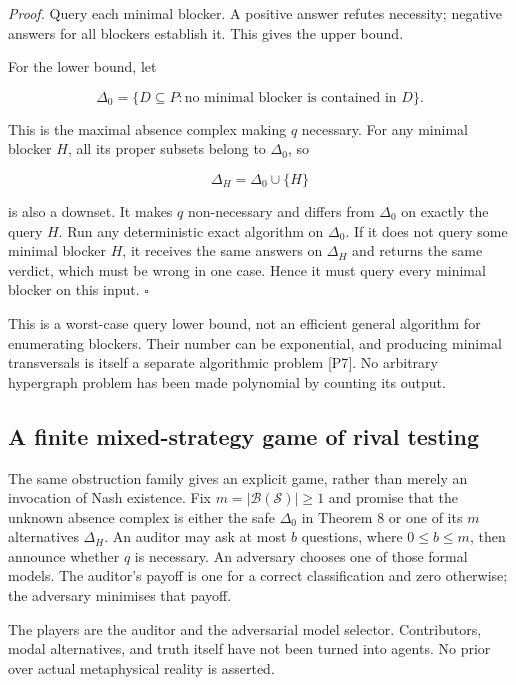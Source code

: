 \documentclass[11pt,a4paper]{article}
\begin{document}
\emph{Proof.} Query each minimal blocker. A positive answer refutes
necessity; negative answers for all blockers establish it. This gives
the upper bound.

For the lower bound, let

\nopagebreak[4]

\[
\Delta_0
 =\{D\subseteq P:\text{no minimal blocker is contained in }D\}.
\]

This is the maximal absence complex making \(q\) necessary. For any
minimal blocker \(H\), all its proper subsets belong to \(\Delta_0\), so

\nopagebreak[4]

\[
\Delta_H=\Delta_0\cup\{H\}
\]

is also a downset. It makes \(q\) non-necessary and differs from
\(\Delta_0\) on exactly the query \(H\). Run any deterministic exact
algorithm on \(\Delta_0\). If it does not query some minimal blocker
\(H\), it receives the same answers on \(\Delta_H\) and returns the same
verdict, which must be wrong in one case. Hence it must query every
minimal blocker on this input. \(\square\)

This is a worst-case query lower bound, not an efficient general
algorithm for enumerating blockers. Their number can be exponential, and
producing minimal transversals is itself a separate algorithmic problem
{[}P7{]}. No arbitrary hypergraph problem has been made polynomial by
counting its output.

\subsection{A finite mixed-strategy game of rival
testing}\label{a-finite-mixed-strategy-game-of-rival-testing}

The same obstruction family gives an explicit game, rather than merely
an invocation of Nash existence. Fix \(m=|\mathscr B(\mathscr S)|\ge1\)
and promise that the unknown absence complex is either the safe
\(\Delta_0\) in Theorem 8 or one of its \(m\) alternatives \(\Delta_H\).
An auditor may ask at most \(b\) questions, where \(0\le b\le m\), then
announce whether \(q\) is necessary. An adversary chooses one of those
formal models. The auditor's payoff is one for a correct classification
and zero otherwise; the adversary minimises that payoff.

The players are the auditor and the adversarial model selector.
Contributors, modal alternatives, and truth itself have not been turned
into agents. No prior over actual metaphysical reality is asserted.
\end{document}
